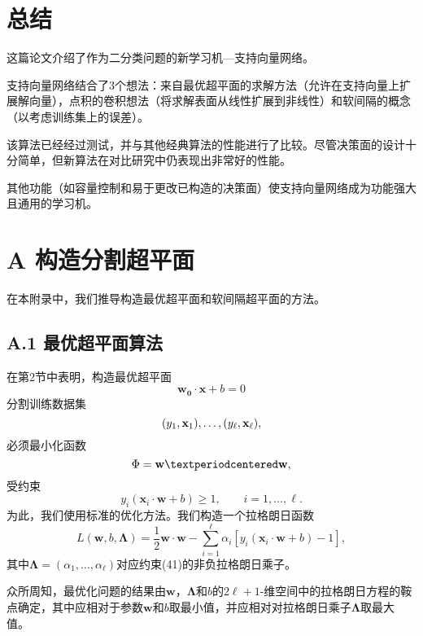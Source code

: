 \documentclass[lang=cn,11pt,a4paper]{elegantpaper}
\begin{document}
	\section{总结}
	这篇论文介绍了作为二分类问题的新学习机—支持向量网络。

	支持向量网络结合了$3$个想法：来自最优超平面的求解方法（允许在支持向量上扩展解向量），点积的卷积想法（将求解表面从线性扩展到非线性）和软间隔的概念（以考虑训练集上的误差）。

	该算法已经经过测试，并与其他经典算法的性能进行了比较。尽管决策面的设计十分简单，但新算法在对比研究中仍表现出非常好的性能。

	其他功能（如容量控制和易于更改已构造的决策面）使支持向量网络成为功能强大且通用的学习机。

	\section*{A 构造分割超平面}
	在本附录中，我们推导构造最优超平面和软间隔超平面的方法。

	\subsection*{A.1 最优超平面算法}
	在第2节中表明，构造最优超平面
	\begin{equation}
		\mathbf{w_0·x}+b=0\tag{40}
	\end{equation}
	分割训练数据集
	\begin{equation}
		(y_1,\mathbf{x}_1),\ldots,(y_\ell,\mathbf{x}_\ell),\notag
	\end{equation}
	必须最小化函数
	\begin{equation}
		\Phi=\mathbf{w}·\mathbf{w},\notag
	\end{equation}
	受约束
	\begin{equation}
		y_i(\mathbf{x}_i·\mathbf{w}+b)\geq1,\qquad i=1,\ldots,\ell.\tag{41}
	\end{equation}
	为此，我们使用标准的优化方法。我们构造一个拉格朗日函数
	\begin{equation}
		L(\mathbf{w},b,\mathbf{\Lambda})=\frac{1}{2}\mathbf{w}\cdot\mathbf{w}-\sum_{i=1}^\ell\alpha_i[y_i(\mathbf{x}_i\cdot\mathbf{w}+b)-1],\tag{42}
	\end{equation}
	其中$\mathbf{\Lambda}=(\alpha_1,\dots,\alpha_\ell)$对应约束(41)的非负拉格朗日乘子。

	众所周知，最优化问题的结果由$\mathbf{w}$，$\mathbf{\Lambda}$和$b$的$2\ell+1$-维空间中的拉格朗日方程的鞍点确定，其中应相对于参数$\mathbf{w}$和$b$取最小值，并应相对对拉格朗日乘子$\mathbf{\Lambda}$取最大值。
\end{document}

